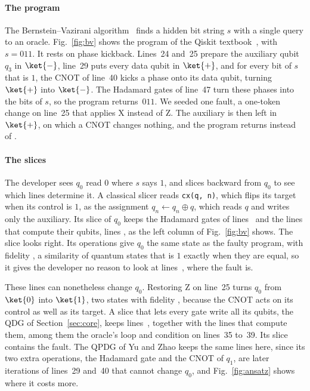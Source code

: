 \paragraph*{The program}
The Bernstein--Vazirani algorithm~\cite{bernstein1997qct} finds a hidden bit string $s$ with a single query to an
oracle. Fig.~\ref{fig:bv} shows the program of the Qiskit textbook~\cite{qiskittextbook}, with $s = 011$. It rests on
phase kickback. Lines~24 and~25 prepare the auxiliary qubit $q_3$ in $\ket{-}$, line~29 puts every data qubit in
$\ket{+}$, and for every bit of $s$ that is $1$, the CNOT of line~40 kicks a phase onto its data qubit, turning
$\ket{+}$ into $\ket{-}$. The Hadamard gates of line~47 turn these phases into the bits of $s$, so the program
returns~$011$. We seeded one fault, a one-token change on line~25 that applies X instead of Z. The auxiliary is
then left in $\ket{+}$, on which a CNOT changes nothing, and the program returns \numBvBuggyOut{} instead of
\numBvFixedOut{}.

\paragraph*{The slices}
The developer sees $q_0$ read $0$ where $s$ says $1$, and slices backward from $q_0$ to see which lines determine it.
A classical slicer reads \texttt{cx(q, n)}, which flips its target when its control is $1$, as the assignment
$q_n \leftarrow q_n \oplus q$, which reads $q$ and writes only the auxiliary. Its slice of $q_0$ keeps the Hadamard
gates of lines~\numBvCpdgLines{} and the lines that compute their qubits, lines \numBvCpdgClassical{}, as the left
column of Fig.~\ref{fig:bv} shows. The slice looks right. Its \numBvCpdgOps{} operations give $q_0$ the same state as
the faulty program, with fidelity \numBvCpdgFidelity{}, a similarity of quantum states that is $1$ exactly when they
are equal, so it gives the developer no reason to look at lines~\numBvMissedLines{}, where the fault is.

These lines can nonetheless change $q_0$. Restoring Z on line~25 turns $q_0$ from $\ket{0}$ into $\ket{1}$, two states
with fidelity \numBvFixFidelity{}, because the CNOT acts on its control as well as its target. A slice that lets
every gate write all its qubits, the QDG of Section~\ref{sec:core}, keeps lines~\numBvQdgLines{}, together with the
lines that compute them, among them the oracle's loop and condition on lines~35 to~39. Its slice contains the fault. The QPDG of Yu and Zhao keeps the same lines here, since its two extra operations, the Hadamard gate and the
CNOT of $q_1$, are later iterations of lines~29 and~40 that cannot change $q_0$, and Fig.~\ref{fig:ansatz} shows where
it costs more.

